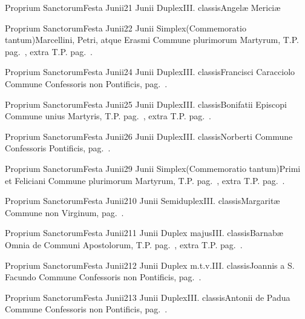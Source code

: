 \documentclass[nocturnale-romanum.tex]{subfiles}
\begin{document}

	{Proprium Sanctorum}{Festa Junii}{2}{1 Junii}
	{Duplex}{III. classis}{Angelæ Mericiæ}
	{}
	{}

	{Proprium Sanctorum}{Festa Junii}{2}{2 Junii}
	{Simplex}{(Commemoratio tantum)}{Marcellini, Petri, atque Erasmi}
	{Commune plurimorum Martyrum, T.P. pag.\ \pageref{M-MRTP}, extra T.P. pag.\ \pageref{M-PMEX}.}
	{}

	{Proprium Sanctorum}{Festa Junii}{2}{4 Junii}
	{Duplex}{III. classis}{Francisci Caracciolo}
	{Commune Confessoris non Pontificis, pag.\ \pageref{M-CONP}.}
	{}

	{Proprium Sanctorum}{Festa Junii}{2}{5 Junii}
	{Duplex}{III. classis}{Bonifatii Episcopi}
	{Commune unius Martyris, T.P. pag.\ \pageref{M-MRTP}, extra T.P. pag.\ \pageref{M-UMEX}.}
	{}

	{Proprium Sanctorum}{Festa Junii}{2}{6 Junii}
	{Duplex}{III. classis}{Norberti}
	{Commune Confessoris Pontificis, pag.\ \pageref{M-COPO}.}
	{}

	{Proprium Sanctorum}{Festa Junii}{2}{9 Junii}
	{Simplex}{(Commemoratio tantum)}{Primi et Feliciani}
	{Commune plurimorum Martyrum, T.P. pag.\ \pageref{M-MRTP}, extra T.P. pag.\ \pageref{M-PMEX}.}
	{}

	{Proprium Sanctorum}{Festa Junii}{2}{10 Junii}
	{Semiduplex}{III. classis}{Margaritæ}
	{Commune non Virginum, pag.\ \pageref{M-MU}.}
	{}

	{Proprium Sanctorum}{Festa Junii}{2}{11 Junii}
	{Duplex majus}{III. classis}{Barnabæ}
	{Omnia de Communi Apostolorum, T.P. pag.\ \pageref{M-APTP}, extra T.P. pag.\ \pageref{M-APEX}.}
	{}

	{Proprium Sanctorum}{Festa Junii}{2}{12 Junii}
	{Duplex m.t.v.}{III. classis}{Joannis a S. Facundo}
	{Commune Confessoris non Pontificis, pag.\ \pageref{M-CONP}.}
	{}

	{Proprium Sanctorum}{Festa Junii}{2}{13 Junii}
	{Duplex}{III. classis}{Antonii de Padua}
	{Commune Confessoris non Pontificis, pag.\ \pageref{M-CONP}.}
	{}
\end{document}
